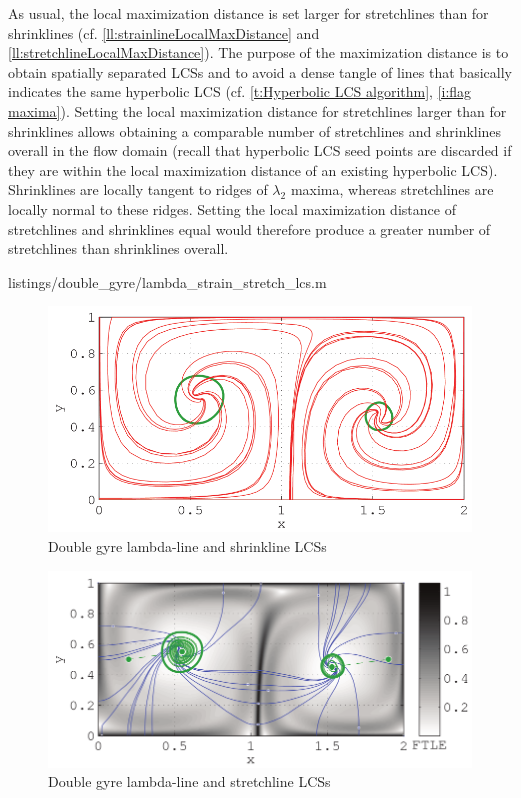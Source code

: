 \documentclass{elsarticle}
\begin{document}
As usual, the local maximization distance is set larger for stretchlines than for shrinklines (cf. \cref{ll:strainlineLocalMaxDistance} and \cref{ll:stretchlineLocalMaxDistance}). The purpose of the maximization distance is to obtain spatially separated LCSs and to avoid a dense tangle of lines that basically indicates the same hyperbolic LCS (cf. \cref{t:Hyperbolic LCS algorithm}, \cref{i:flag maxima}). Setting the local maximization distance for stretchlines larger than for shrinklines allows obtaining a comparable number of stretchlines and shrinklines overall in the flow domain (recall that hyperbolic LCS seed points are discarded if they are within the local maximization distance of an existing hyperbolic LCS). Shrinklines are locally tangent to ridges of $\lambda_2$ maxima, whereas stretchlines are locally normal to these ridges. Setting the local maximization distance of stretchlines and shrinklines equal would therefore produce a greater number of stretchlines than shrinklines overall.


{listings/double_gyre/lambda_strain_stretch_lcs.m}

\begin{figure}
\centering
\includegraphics[width=\textwidth]{graphics/double_gyre/lambda_strain_lcs}
\caption{Double gyre lambda-line and shrinkline LCSs}
\label{fig:double_gyre_lambda_strain_lcs}
\end{figure}

\begin{figure}
\centering
\includegraphics[width=\textwidth]{graphics/double_gyre/lambda_stretch_lcs}
\caption{Double gyre lambda-line and stretchline LCSs}
\label{fig:double_gyre_lambda_stretch_lcs}
\end{figure}
\end{document}
